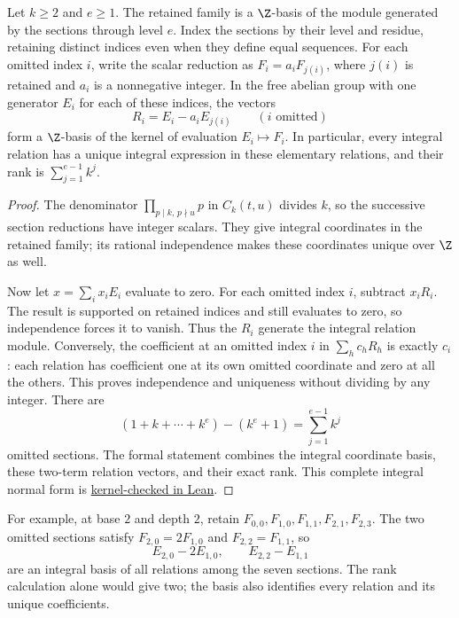 \documentclass[11pt]{article}
\begin{document}
\begin{corollary}\label{cor:integral-normal-form}
Let $k\ge2$ and $e\ge1$. The retained family is a $\Z$-basis of the
module generated by the sections through level $e$. Index the sections
by their level and residue, retaining distinct indices even when they
define equal sequences. For each omitted index $i$, write the scalar
reduction as $F_i=a_iF_{j(i)}$, where $j(i)$ is retained and $a_i$ is a
nonnegative integer. In the free abelian group with one generator $E_i$
for each of these indices, the vectors
\[
 R_i=E_i-a_iE_{j(i)}\qquad(i\text{ omitted})
\]
form a $\Z$-basis of the kernel of evaluation $E_i\mapsto F_i$.
In particular, every integral relation has a unique integral expression
in these elementary relations, and their rank is
$\sum_{j=1}^{e-1}k^j$.
\end{corollary}
\begin{proof}
The denominator $\prod_{p\mid k,\,p\nmid u}p$ in $C_k(t,u)$ divides $k$,
so the successive section reductions have integer scalars. They give
integral coordinates in the retained family; its rational independence
makes these coordinates unique over $\Z$ as well.

Now let $x=\sum_i x_iE_i$ evaluate to zero. For each omitted index $i$,
subtract $x_iR_i$. The result is supported on retained indices and still
evaluates to zero, so independence forces it to vanish. Thus the $R_i$
generate the integral relation module. Conversely, the coefficient at
an omitted index $i$ in $\sum_h c_hR_h$ is exactly $c_i$: each relation
has coefficient one at its own omitted coordinate and zero at all the
others. This proves independence and uniqueness without dividing by
any integer. There are
\[
 (1+k+\cdots+k^e)-(k^e+1)=\sum_{j=1}^{e-1}k^j
\]
omitted sections. The formal statement combines the integral coordinate
basis, these two-term relation vectors, and their exact rank.
This complete integral normal form is \href{https://github.com/wcook04/plectis-erdos/blob/25ef6245d15a47548c6926369ae8f1a0f0a14a80/ErdosProblems/Erdos249/PaperCompleteR8/KernelRelationBasis.lean#L398}{kernel-checked in Lean}.
\end{proof}

For example, at base $2$ and depth $2$, retain
$F_{0,0},F_{1,0},F_{1,1},F_{2,1},F_{2,3}$. The two omitted sections satisfy
$F_{2,0}=2F_{1,0}$ and $F_{2,2}=F_{1,1}$, so
\[
 E_{2,0}-2E_{1,0},\qquad E_{2,2}-E_{1,1}
\]
are an integral basis of all relations among the seven sections. The
rank calculation alone would give two; the basis also identifies every
relation and its unique coefficients.
\end{document}
